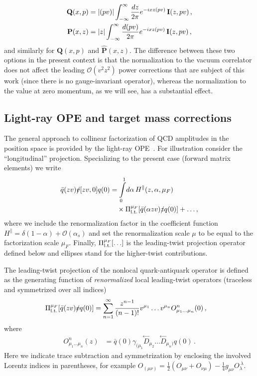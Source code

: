 \documentclass[aps,prd,twocolumn,a4paper,superscriptaddress,10pt,showpacs,notitlepage,floatfix]{revtex4-1}
\begin{document}
\begin{align}
\mathbf{Q}(x,p) &= |(pv)| \int_{-\infty}^\infty \frac{d z }{2\pi} e^{-ix z (pv)} \, \mathbf{I}(z, pv)\,,
\notag\\
\mathbf{P}(x,z) &= |z| \int_{-\infty}^\infty \frac{d (pv)}{2\pi} e^{-ix z (pv) } \,  \mathbf{I}(z,pv)\,,     
\end{align} 
and similarly for $\widehat{\mathbf{Q}}(x,p)$ and $\widehat{\mathbf{P}}(x,z)$.
The difference between these two options in the present context is that the normalization to the vacuum correlator 
does not affect the leading $\mathcal{O}(v^2z^2)$ power corrections that are subject of this work (since there is no gauge-invariant operator),
whereas the normalization to the value at zero momentum, as we will see, has a substantial effect. 

%
\subsection{Light-ray OPE and target mass corrections}\label{subsect_OPE}%
%

The general approach to collinear factorization of QCD amplitudes in the position space is provided by the light-ray OPE~\cite{Anikin:1978tj,Anikin:1979kq,Balitsky:1987bk,Mueller:1998fv,Balitsky:1990ck,Geyer:1999uq}. For illustration consider the ``longitudinal'' projection. Specializing to the present case (forward matrix elements) we write
\begin{align}
\label{light-ray-OPE}
 \bar q(zv) \slashed{v} [zv,0] q(0) &= \int\limits_0^1\!d\alpha \, H^\parallel(z,\alpha,\mu_F)
\notag\\&\quad \times \Pi_{\rm l.t.}^{\mu_F}[\bar q (\alpha z v) \slashed{z} q(0)] + \ldots,
\end{align} 
where we include the renormalization factor in the coefficient function $H^\parallel = \delta(1-\alpha) + \mathcal{O}(\alpha_s)$ and set 
the renormalization scale $\mu$ to be equal to the factorization scale $\mu_F$. 
Finally,  $\Pi_{\rm l.t.}^{\mu_F}[\ldots]$ is the leading-twist projection operator defined below and
ellipses stand for the higher-twist contributions.

The leading-twist projection of the nonlocal quark-antiquark operator is 
defined as the generating function of \emph{renormalized} 
local leading-twist operators  (traceless and symmetrized over all indices)
\begin{align}
\Pi_{\rm l.t.}^{\mu_F}[\bar q (z v) \slashed{v} q(0)]
&= \sum_{n=1}^\infty \frac{z^{n-1}}{(n-1)!} v^{\mu_1}\ldots v^{\mu_n} O_{\mu_1\ldots\mu_n}^{n}(0)\,,
\label{eq:LTprojector}
\end{align}
where 
\begin{align}
  O_{\mu_1\ldots\mu_n}^{n}(z) &= 
\bar q(0)\gamma_{(\mu_1}\!\!\stackrel{\leftarrow}{D}_{\mu_2}\ldots \!\stackrel{\leftarrow}{D}_{\mu_{n})} q(0)\,.  
\end{align}
%
Here we indicate trace subtraction and symmetrization by enclosing the involved Lorentz indices in parentheses,
for example $O_{(\mu\nu)} = \frac12 (O_{\mu\nu}+ O_{\nu\mu}) - \frac14 g_{\mu\nu} O_{\lambda}^{~\lambda}$.
\end{document}
